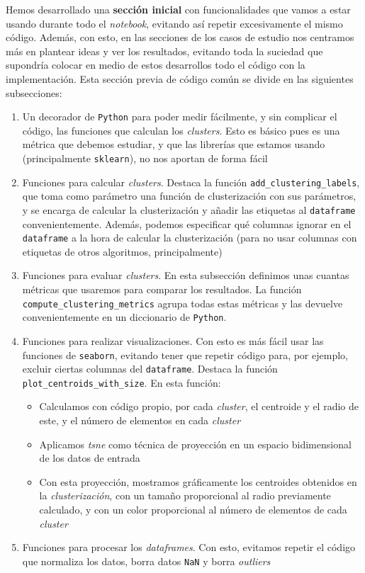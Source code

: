 \documentclass[11pt]{article}
\begin{document}
Hemos desarrollado una \textbf{sección inicial} con funcionalidades que vamos a estar usando durante todo el \emph{notebook}, evitando así repetir excesivamente el mismo código. Además, con esto, en las secciones de los casos de estudio nos centramos más en plantear ideas y ver los resultados, evitando toda la suciedad que supondría colocar en medio de estos desarrollos todo el código con la implementación. Esta sección previa de código común se divide en las siguientes subsecciones:

\begin{enumerate}
    \item Un decorador de \lstinline{Python} para poder medir fácilmente, y sin complicar el código, las funciones que calculan los \emph{clusters}. Esto es básico pues es una métrica que debemos estudiar, y que las librerías que estamos usando (principalmente \lstinline{sklearn}), no nos aportan de forma fácil
    \item Funciones para calcular \emph{clusters}. Destaca la función \lstinline{add_clustering_labels}, que toma como parámetro una función de clusterización con sus parámetros, y se encarga de calcular la clusterización y añadir las etiquetas al \lstinline{dataframe} convenientemente. Además, podemos especificar qué columnas ignorar en el \lstinline{dataframe} a la hora de calcular la clusterización (para no usar columnas con etiquetas de otros algoritmos, principalmente)
    \item Funciones para evaluar \emph{clusters}. En esta subsección definimos unas cuantas métricas que usaremos para comparar los resultados. La función \lstinline{compute_clustering_metrics} agrupa todas estas métricas y las devuelve convenientemente en un diccionario de \lstinline{Python}.
    \item Funciones para realizar visualizaciones. Con esto es más fácil usar las funciones de \lstinline{seaborn}, evitando tener que repetir código para, por ejemplo, excluir ciertas columnas del \lstinline{dataframe}. Destaca la función \lstinline{plot_centroids_with_size}. En esta función:
    \begin{itemize}
        \item Calculamos con código propio, por cada \emph{cluster}, el centroide y el radio de este, y el número de elementos en cada \emph{cluster}
        \item Aplicamos \emph{tsne} como técnica de proyección en un espacio bidimensional de los datos de entrada
        \item Con esta proyección, mostramos gráficamente los centroides obtenidos en la \emph{clusterización}, con un tamaño proporcional al radio previamente calculado, y con un color proporcional al número de elementos de cada \emph{cluster}
    \end{itemize}
    \item Funciones para procesar los \emph{dataframes}. Con esto, evitamos repetir el código que normaliza los datos, borra datos \lstinline{NaN} y borra \emph{outliers}
\end{enumerate}
\end{document}
